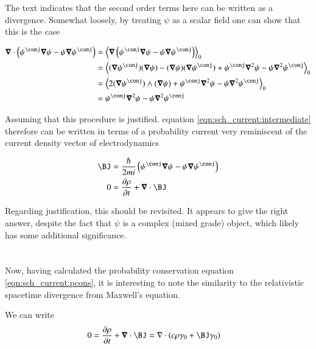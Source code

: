 The text indicates that the second order terms here can be written as a divergence.  Somewhat loosely, by treating $\psi$ as a scalar field one can show that this is the case

\begin{align*}
\spacegrad \cdot \left( \psi^\conj \spacegrad \psi - \psi \spacegrad \psi^\conj \right) 
&=
\gpgradezero{
\spacegrad \left( \psi^\conj \spacegrad \psi - \psi \spacegrad \psi^\conj \right) 
} \\
&=
\gpgradezero{
(\spacegrad \psi^\conj) (\spacegrad \psi) - (\spacegrad \psi) (\spacegrad \psi^\conj)
+\psi^\conj \spacegrad^2 \psi - \psi \spacegrad^2 \psi^\conj
} \\
&=
\gpgradezero{
2 (\spacegrad \psi^\conj) \wedge (\spacegrad \psi) 
+\psi^\conj \spacegrad^2 \psi - \psi \spacegrad^2 \psi^\conj
} \\
&=
\psi^\conj \spacegrad^2 \psi - \psi \spacegrad^2 \psi^\conj
 \\
\end{align*}

Assuming that this procedure is justified.
equation \ref{eqn:sch_current:intermediate} therefore can be written
in terms of a probability current very reminiscent of the current density vector of electrodynamics

\begin{align}\label{eqn:sch_current:pcons}
\BJ &= \frac{\hbar}{2mi} \left( \psi^\conj \spacegrad \psi - \psi \spacegrad \psi^\conj \right) \\
0 &= \PD{t}{\rho} + \spacegrad \cdot \BJ 
\end{align}

Regarding justification, this should be revisited.
It appears to give the right answer, despite the fact that $\psi$ is a complex (mixed grade) object, which
likely has some additional significance.

\section{}

Now, having calculated the probability conservation equation \ref{eqn:sch_current:pcons}, it is interesting to
note the similarity to the relativistic spacetime divergence from Maxwell's equation.

We can write
\begin{align*}
0 = \PD{t}{\rho} + \spacegrad \cdot \BJ &= \grad \cdot \left( c\rho \gamma_0 + \BJ \gamma_0 \right)
\end{align*}

